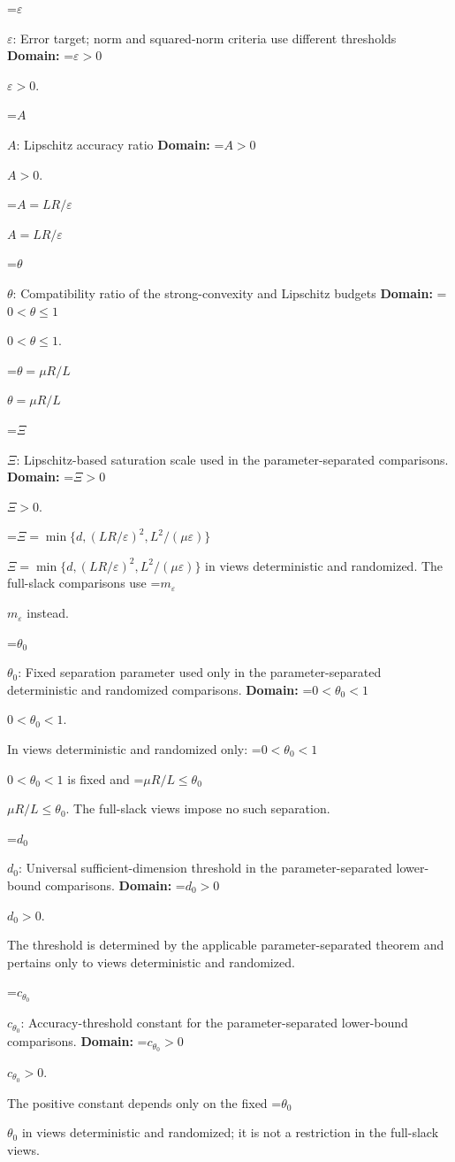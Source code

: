 \documentclass[10pt,a4paper]{article}
\newcommand{\AtlasMath}[1]{\par\begingroup\centering\setbox0=\hbox{$\displaystyle #1$}\ifdim\wd0>1.4\linewidth\typeout{ATLAS WIDE FORMULA: \the\wd0}\fi\ifdim\wd0>\linewidth\resizebox{\linewidth}{!}{\box0}\else\box0\fi\par\endgroup}
\newcommand{\AtlasInlineMath}[1]{\begingroup\setbox0=\hbox{$#1$}\ifdim\wd0>.4\linewidth\endgroup\AtlasMath{#1}\else\endgroup$#1$\fi}
\begin{document}
\AtlasInlineMath{\varepsilon}: Error target; norm and squared-norm criteria use different thresholds \textbf{Domain:} \AtlasInlineMath{\varepsilon>0}.



\AtlasInlineMath{A}: Lipschitz accuracy ratio \textbf{Domain:} \AtlasInlineMath{A>0}.



\AtlasInlineMath{A=LR/\varepsilon}



\AtlasInlineMath{\theta}: Compatibility ratio of the strong-convexity and Lipschitz budgets \textbf{Domain:} \AtlasInlineMath{0<\theta\le1}.



\AtlasInlineMath{\theta=\mu R/L}



\AtlasInlineMath{\Xi}: Lipschitz-based saturation scale used in the parameter-separated comparisons. \textbf{Domain:} \AtlasInlineMath{\Xi>0}.



\AtlasInlineMath{\Xi=\min\{d,(LR/\varepsilon)^2,L^2/(\mu\varepsilon)\}} in views deterministic and randomized. The full-slack comparisons use \AtlasInlineMath{m_\varepsilon} instead.



\AtlasInlineMath{\theta_0}: Fixed separation parameter used only in the parameter-separated deterministic and randomized comparisons. \textbf{Domain:} \AtlasInlineMath{0<\theta_0<1}.



In views deterministic and randomized only: \AtlasInlineMath{0<\theta_0<1} is fixed and \AtlasInlineMath{\mu R/L\le\theta_0}. The full-slack views impose no such separation.



\AtlasInlineMath{d_0}: Universal sufficient-dimension threshold in the parameter-separated lower-bound comparisons. \textbf{Domain:} \AtlasInlineMath{d_0>0}.



The threshold is determined by the applicable parameter-separated theorem and pertains only to views deterministic and randomized.



\AtlasInlineMath{c_{\theta_0}}: Accuracy-threshold constant for the parameter-separated lower-bound comparisons. \textbf{Domain:} \AtlasInlineMath{c_{\theta_0}>0}.



The positive constant depends only on the fixed \AtlasInlineMath{\theta_0} in views deterministic and randomized; it is not a restriction in the full-slack views.
\end{document}
